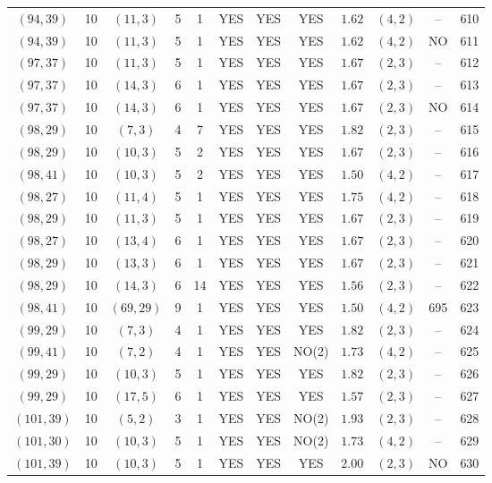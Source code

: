 \begin{longtable}{|c|c|c|c|c|c|c|c|c|c|c|c|}
$(94,39)$ & 10 & $(11,3)$ & 5 & 1 & YES & YES & YES & $1.62$ & $(4,2)$ & -- & 610\\
$(94,39)$ & 10 & $(11,3)$ & 5 & 1 & YES & YES & YES & $1.62$ & $(4,2)$ & NO & 611\\
$(97,37)$ & 10 & $(11,3)$ & 5 & 1 & YES & YES & YES & $1.67$ & $(2,3)$ & -- & 612\\
$(97,37)$ & 10 & $(14,3)$ & 6 & 1 & YES & YES & YES & $1.67$ & $(2,3)$ & -- & 613\\
$(97,37)$ & 10 & $(14,3)$ & 6 & 1 & YES & YES & YES & $1.67$ & $(2,3)$ & NO & 614\\
$(98,29)$ & 10 & $(7,3)$ & 4 & 7 & YES & YES & YES & $1.82$ & $(2,3)$ & -- & 615\\
$(98,29)$ & 10 & $(10,3)$ & 5 & 2 & YES & YES & YES & $1.67$ & $(2,3)$ & -- & 616\\
$(98,41)$ & 10 & $(10,3)$ & 5 & 2 & YES & YES & YES & $1.50$ & $(4,2)$ & -- & 617\\
$(98,27)$ & 10 & $(11,4)$ & 5 & 1 & YES & YES & YES & $1.75$ & $(4,2)$ & -- & 618\\
$(98,29)$ & 10 & $(11,3)$ & 5 & 1 & YES & YES & YES & $1.67$ & $(2,3)$ & -- & 619\\
$(98,27)$ & 10 & $(13,4)$ & 6 & 1 & YES & YES & YES & $1.67$ & $(2,3)$ & -- & 620\\
$(98,29)$ & 10 & $(13,3)$ & 6 & 1 & YES & YES & YES & $1.67$ & $(2,3)$ & -- & 621\\
$(98,29)$ & 10 & $(14,3)$ & 6 & 14 & YES & YES & YES & $1.56$ & $(2,3)$ & -- & 622\\
$(98,41)$ & 10 & $(69,29)$ & 9 & 1 & YES & YES & YES & $1.50$ & $(4,2)$ & 695 & 623\\
$(99,29)$ & 10 & $(7,3)$ & 4 & 1 & YES & YES & YES & $1.82$ & $(2,3)$ & -- & 624\\
$(99,41)$ & 10 & $(7,2)$ & 4 & 1 & YES & YES & NO(2) & $1.73$ & $(4,2)$ & -- & 625\\
$(99,29)$ & 10 & $(10,3)$ & 5 & 1 & YES & YES & YES & $1.82$ & $(2,3)$ & -- & 626\\
$(99,29)$ & 10 & $(17,5)$ & 6 & 1 & YES & YES & YES & $1.57$ & $(2,3)$ & -- & 627\\
$(101,39)$ & 10 & $(5,2)$ & 3 & 1 & YES & YES & NO(2) & $1.93$ & $(2,3)$ & -- & 628\\
$(101,30)$ & 10 & $(10,3)$ & 5 & 1 & YES & YES & NO(2) & $1.73$ & $(4,2)$ & -- & 629\\
$(101,39)$ & 10 & $(10,3)$ & 5 & 1 & YES & YES & YES & $2.00$ & $(2,3)$ & NO & 630\\

\end{longtable}
